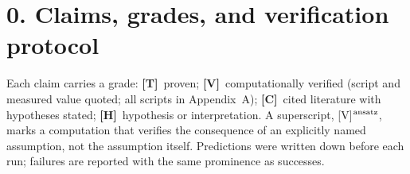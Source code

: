 \documentclass[11pt]{article}
\theoremstyle{definition}
\theoremstyle{remark}
\begin{document}
\begin{abstract}
numerically resolved pair exchange; a minimal two-dimensional shell closes the oscillatory-onset question at the mechanism level; the flare-hazard law is closed at the statistical-inverse level; and a hemispheric variant closes the Parker--Yoshimura test: the migration direction flips with the sign of the dynamo number, equatorward for negative $\alpha G$. Every borrowed result---nonmodal growth in
sub-Alfv\'enic shear layers, optimal kinematic dynamos, transient black-hole
superradiance---is cited with its hypotheses named; every computational number in this
paper that is graded [V] is generated by the scripts printed in the
appendix; literature and observational values are cited separately.
\end{abstract}

\section*{0. Claims, grades, and verification protocol}
Each claim carries a grade: \textbf{[T]}~proven; \textbf{[V]}~computationally
verified (script and measured value quoted; all scripts in Appendix~A);
\textbf{[C]}~cited literature with hypotheses stated; \textbf{[H]}~hypothesis
or interpretation. A superscript, [V]$^{\rm ansatz}$, marks a computation
that verifies the consequence of an explicitly named assumption, not the
assumption itself. Predictions were written down before each run; failures
are reported with the same prominence as successes.
\end{document}

